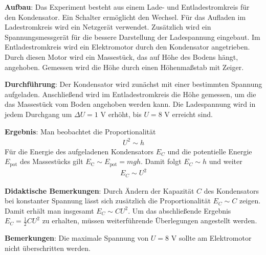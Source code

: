 \documentclass[../main.tex]{subfiles}
\begin{document}
\begin{tcolorbox}
    \vspace{0.4cm}
    \textbf{Aufbau}: Das Experiment besteht aus einem Lade- und Entladestromkreis für den Kondensator. Ein Schalter ermöglicht den Wechsel. Für das Aufladen im Ladestromkreis wird ein Netzgerät verwendet. Zusätzlich wird ein Spannungsmessgerät für die bessere Darstellung der Ladespannung eingebaut. Im Entladestromkreis wird ein Elektromotor durch den Kondensator angetrieben. Durch diesen Motor wird ein Massestück, das auf Höhe des Bodens hängt, angehoben. Gemessen wird die Höhe durch einen Höhenmaßstab mit Zeiger.   
    
    \vspace{0.4cm}
    \textbf{Durchführung}: Der Kondensator wird zunächst mit einer bestimmten Spannung aufgeladen. Anschließend wird im Entladestromkreis die Höhe gemessen, um die das Massestück vom Boden angehoben werden kann. Die Ladespannung wird in jedem Durchgang um $\Delta U=1$ V erhöht, bis $U=8$ V erreicht sind.

    \vspace{0.4cm}
    \textbf{Ergebnis}: Man beobachtet die Proportionalität
    \begin{align*}
        U^2 \sim h
    \end{align*}
    Für die Energie des aufgeladenen Kondensators $E_C$ und die potentielle Energie $E_{\text{pot}}$ des Massestücks gilt $E_{\text{C}} \sim E_{\text{pot}}=mgh$. Damit folgt $E_C \sim h$ und weiter
    \begin{align*}
        E_C \sim U^2
    \end{align*}
    
\vspace{0.4cm}
    \textbf{Didaktische Bemerkungen}: Durch Ändern der Kapazität $C$ des Kondensators bei konstanter Spannung lässt sich zusätzlich die Proportionalität $E_C \sim C$ zeigen. Damit erhält man insgesamt $E_C \sim CU^2$. Um das abschließende Ergebnis $E_C=\frac{1}{2}CU^2$ zu erhalten, müssen weiterführende Überlegungen angestellt werden. 

    \vspace{0.4cm}
    \textbf{Bemerkungen}: Die maximale Spannung von $U=8$ V sollte am Elektromotor nicht überschritten werden. 
\end{tcolorbox}
\end{document}
